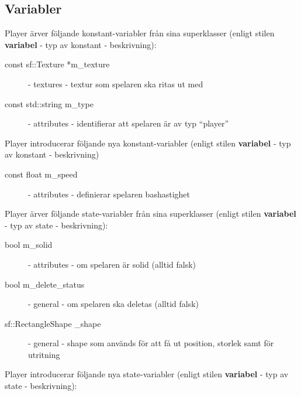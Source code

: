 \documentclass{TDP003mall}
\begin{document}
\subsection{Variabler}
Player ärver följande konstant-variabler från sina superklasser (enligt stilen \textbf{variabel} - typ av konstant - beskrivning):
\begin{description}
\item[const sf::Texture *m\_texture] - textures - textur som spelaren ska ritas ut med
\item[const std::string m\_type] - attributes - identifierar att spelaren är av typ ``player''
\end{description}
Player introducerar följande nya konstant-variabler (enligt stilen \textbf{variabel} - typ av konstant - beskrivning)
\begin{description}
\item[const float m\_speed] - attributes - definierar spelaren bashastighet
\end{description}
Player ärver följande state-variabler från sina superklasser (enligt stilen \textbf{variabel} - typ av state - beskrivning):
\begin{description}
\item[bool m\_solid] - attributes - om spelaren är solid (alltid falsk)
\item[bool m\_delete\_status] - general - om spelaren ska deletas (alltid falsk)
\item[sf::RectangleShape \_shape] - general - shape som används för att få ut position, storlek samt för utritning
\end{description}
Player introducerar följande nya state-variabler (enligt stilen \textbf{variabel} - typ av state - beskrivning):
\end{document}
